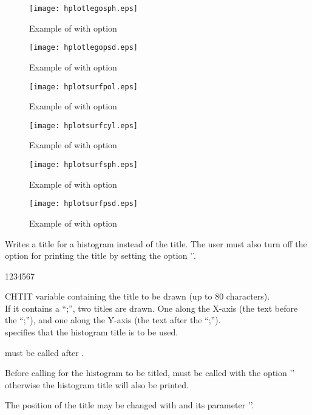 \begin{figure}[p]
\begin{center} \texttt{[image: hplotlegosph.eps]}\end{center}
\caption{Example of \protect{} with \protect{} option}
\begin{center} \texttt{[image: hplotlegopsd.eps]}\end{center}
\caption{Example of \protect{} with \protect{} option}
\end{figure}

\begin{figure}[p]
\begin{center} \texttt{[image: hplotsurfpol.eps]}\end{center}
\caption{Example of \protect{} with \protect{} option}
\begin{center}\texttt{[image: hplotsurfcyl.eps]}\end{center}
\caption{Example of \protect{} with \protect{} option}
\end{figure}

\begin{figure}[p]
\begin{center} \texttt{[image: hplotsurfsph.eps]}\end{center}
\caption{Example of \protect{} with \protect{} option}
\begin{center} \texttt{[image: hplotsurfpsd.eps]}\end{center}
\caption{Example of \protect{} with \protect{} option}
\end{figure}
\clearpage


\Action
Writes a title for a histogram instead of the \HBOOK{} title. The user must also
turn off the option for printing the \HBOOK{} title by setting the option 
''.
\Pdesc
\begin{DLtt}{1234567}
\item[CHTIT] \CHARACTER{} variable containing the title to be drawn
             (up to 80 characters).\\
             If it contains a ``;'', two titles are drawn. One along the
             X-axis (the text before the ``;''), and one along the Y-axis
             (the text after the ``;'').\\
              specifies that the \HBOOK{} histogram title is 
             to be used.
\end{DLtt}
\Remarks
\begin{UL}
\item {} must be called after \HPLOT.
\item Before calling \HPLOT{} for the histogram to be titled,  must
      be called with the option '' otherwise the \HBOOK{} histogram 
      title will also be printed.
\item The position of the title may be changed with  and its 
      parameter ''.
\end{UL}


